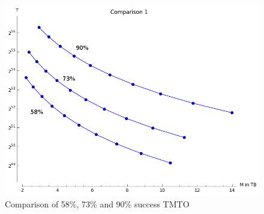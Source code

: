 \begin{figure}[H]
  \centering
  \includegraphics[scale=0.4]{figures/compareHmsc1.png}
  \caption{Comparison of 58\%, 73\% and 90\% success TMTO}
  \label{fig:comparisonhell}
\end{figure}


